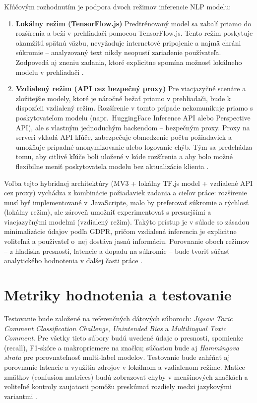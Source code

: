 Kľúčovým rozhodnutím je podpora dvoch režimov inferencie NLP modelu:
\begin{enumerate}
  \item \textbf{Lokálny režim (TensorFlow.js)}  
  Predtrénovaný model sa zabalí priamo do rozšírenia a beží v prehliadači pomocou TensorFlow.js. Tento režim poskytuje okamžitú spätnú väzbu, nevyžaduje internetové pripojenie a najmä chráni súkromie -- analyzovaný text nikdy neopustí zariadenie používateľa. Zodpovedá aj zneniu zadania, ktoré explicitne spomína možnosť lokálneho modelu v prehliadači \cite{tfjsToxicity}.

  \item \textbf{Vzdialený režim (API cez bezpečný proxy)}  
  Pre viacjazyčné scenáre a zložitejšie modely, ktoré je náročné bežať priamo v prehliadači, bude k dispozícii vzdialený režim. Rozšírenie v tomto prípade nekomunikuje priamo s poskytovateľom modelu (napr.\ HuggingFace Inference API alebo Perspective API), ale s vlastným jednoduchým backendom -- bezpečným proxy. Proxy na serveri vkladá API kľúče, zabezpečuje obmedzenie počtu požiadaviek a umožňuje prípadné anonymizovanie alebo logovanie chýb. Tým sa predchádza tomu, aby citlivé kľúče boli uložené v kóde rozšírenia a aby bolo možné flexibilne meniť poskytovateľa modelu bez aktualizácie klienta \cite{perspectiveAPI}\cite{chromeCSP}.
\end{enumerate}

Voľba tejto hybridnej architektúry (MV3 + lokálny TF.js model + vzdialené API cez proxy) vychádza z kombinácie požiadaviek zadania a cieľov práce: rozšírenie musí byť implementované v~JavaScripte, malo by preferovať súkromie a rýchlosť (lokálny režim), ale zároveň umožniť experimentovať s presnejšími a viacjazyčnými modelmi (vzdialený režim). Takýto prístup je v súlade so zásadou minimalizácie údajov podľa GDPR, pričom vzdialená inferencia je explicitne voliteľná a používateľ o~nej dostáva jasnú informáciu. Porovnanie oboch režimov -- z hľadiska presnosti, latencie a dopadu na súkromie -- bude tvoriť súčasť analytického hodnotenia v ďalšej časti práce \cite{edpb2019dpbdd}.

\section{Metriky hodnotenia a testovanie}
Testovanie bude založené na referenčných dátových súboroch: \emph{Jigsaw Toxic Comment Classification Challenge}, \emph{Unintended Bias} a \emph{Multilingual Toxic Comment}. Pre všetky tieto súbory budú uvedené údaje o presnosti, spomienke (recall), F1-skóre a makropriemere na značku; súčasťou bude aj \emph{Hammingova strata} pre porovnateľnosť multi-label modelov. Testovanie bude zahŕňať aj porovnanie latencie a využitia zdrojov v lokálnom a vzdialenom režime. Matice zmätkov (confusion matrices) budú zobrazovať chyby v menšinových značkách a voliteľné kontroly zaujatosti pomôžu preskúmať rozdiely medzi jazykovými variantmi \cite{tsoumakas2007multilabel}\cite{jigsaw2018toxic}\cite{jigsaw2019bias}\cite{jigsaw2020multilingual}\cite{sikiandani2025browser}
\cite{tfjsToxicity}\cite{chromemv3}\cite{borkan2019nuanced}\cite{sap2019racialbias}\cite{hatecheck2021}\cite{sklearnF1}\cite{sklearnHamming}.

